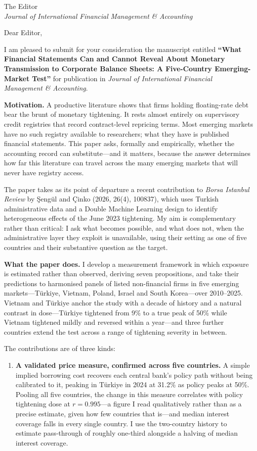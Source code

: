 \documentclass[11pt]{letter}
\begin{document}
\begin{letter}{The Editor\\ \emph{Journal of International
Financial Management \& Accounting}}

\opening{Dear Editor,}

I am pleased to submit for your consideration the manuscript entitled
\textbf{``What Financial Statements Can and Cannot Reveal About Monetary
Transmission to Corporate Balance Sheets: A Five-Country Emerging-Market
Test''} for publication in \emph{Journal of International Financial
Management \& Accounting}.

\textbf{Motivation.} A productive literature shows that firms holding
floating-rate debt bear the brunt of monetary tightening. It rests almost
entirely on supervisory credit registries that record contract-level repricing
terms. Most emerging markets have no such registry available to researchers;
what they have is published financial statements. This paper asks, formally
and empirically, whether the accounting record can substitute---and it
matters, because the answer determines how far this literature can travel
across the many emerging markets that will never have registry access.

The paper takes as its point of departure a recent contribution to
\emph{Borsa Istanbul Review} by \c{S}eng\"ul and \c{C}inko (2026, 26(4),
100837), which uses Turkish administrative data and a Double Machine Learning
design to identify heterogeneous effects of the June 2023 tightening. My aim
is complementary rather than critical: I ask what becomes possible, and what
does not, when the administrative layer they exploit is unavailable, using
their setting as one of five countries and their substantive question as the
target.

\textbf{What the paper does.} I develop a measurement framework in which
exposure is estimated rather than observed, deriving seven propositions, and
take their predictions to harmonised panels of listed non-financial firms in
five emerging markets---T\"{u}rkiye, Vietnam, Poland, Israel and South
Korea---over 2010--2025. Vietnam and T\"{u}rkiye anchor the study with a
decade of history and a natural contrast in dose---T\"{u}rkiye tightened from
9\% to a true peak of 50\% while Vietnam tightened mildly and reversed within
a year---and three further countries extend the test across a range of
tightening severity in between.

The contributions are of three kinds:

\begin{enumerate}
\item \textbf{A validated price measure, confirmed across five countries.} A
simple implied borrowing cost recovers each central bank's policy path without
being calibrated to it, peaking in T\"{u}rkiye in 2024 at 31.2\% as policy
peaks at 50\%. Pooling all five countries, the change in this measure
correlates with policy tightening dose at $r=0.995$---a figure I read
qualitatively rather than as a precise estimate, given how few countries that
is---and median interest coverage falls in every single country. I use the
two-country history to estimate pass-through of roughly one-third alongside a
halving of median interest coverage.


\end{enumerate}
\end{letter}
\end{document}
